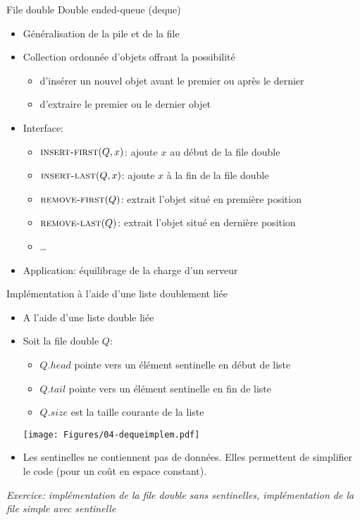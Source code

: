 \begin{frame}{File double}
Double ended-queue (deque)

\bigskip

\begin{itemize}
\item Généralisation de la pile et de la file
\item Collection ordonnée d'objets offrant la possibilité
\begin{itemize}
\item d'insérer un nouvel objet \alert{avant le premier} ou \alert{après le dernier}
\item d'extraire le \alert{premier} ou le \alert{dernier} objet
\end{itemize}
\item Interface:
\begin{itemize}
\item $\textnormal{\scshape insert-first}(Q,x)$: ajoute $x$ au début de la file double
\item $\textnormal{\scshape insert-last}(Q,x)$: ajoute $x$ à la fin de la file double
\item $\textnormal{\scshape remove-first}(Q)$: extrait l'objet situé en première position
\item $\textnormal{\scshape remove-last}(Q)$: extrait l'objet situé en dernière position
\item \ldots
\end{itemize}
\item Application: équilibrage de la charge d'un serveur
\end{itemize}

\end{frame}

\begin{frame}{Implémentation à l'aide d'une liste doublement liée}
\begin{itemize}
\item A l'aide d'une liste double liée
\item Soit la file double $Q$:
\begin{itemize}
\item $Q.head$ pointe vers un élément \alert{sentinelle} en début de liste
\item $Q.tail$ pointe vers un élément \alert{sentinelle} en fin de liste
\item $Q.size$ est la taille courante de la liste
\end{itemize}

\centerline{\texttt{[image: Figures/04-dequeimplem.pdf]}}

\item Les sentinelles ne contiennent pas de données. Elles permettent
  de simplifier le code (pour un coût en espace constant).
\end{itemize}

\bigskip

{\it Exercice: implémentation de la file double sans
  sentinelles, implémentation de la file simple avec sentinelle}

\end{frame}

